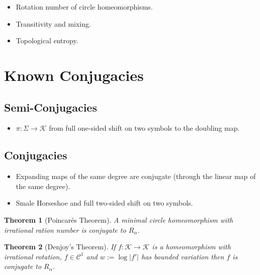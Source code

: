 \documentclass[11pt]{article}
\newcommand{\defeq}{:=}
\newcommand{\abs}[1]{|#1|}
\newtheorem{theorem}{Theorem}[section]
\begin{document}
\begin{itemize}
	\item Rotation number of circle homeomorphisms.
	\item Transitivity and mixing.
	\item Topological entropy.
\end{itemize}

\section{Known Conjugacies}

\subsection{Semi-Conjugacies}

\begin{itemize}
	\item $\pi:\Sigma\to\mathcal{K}$ from full one-sided shift on two symbols to the doubling map.
\end{itemize}

\subsection{Conjugacies}

\begin{itemize}
	\item Expanding maps of the same degree are conjugate (through the linear map of the same degree).
	\item Smale Horseshoe and full two-sided shift on two symbols.
\end{itemize}

\begin{theorem}[Poincar\'es Theorem]
A minimal circle homeomorphism with irrational ration number is conjugate to $R_\alpha$.
\end{theorem}

\begin{theorem}[Denjoy's Theorem]
If $f:\mathcal{K}\to\mathcal{K}$ is a homeomorphism with irrational rotation, $f\in\mathcal{C}^1$ and $w\defeq \log\abs{f'}$ has bounded variation then $f$ is conjugate to $R_\alpha$.
\end{theorem}
\end{document}
